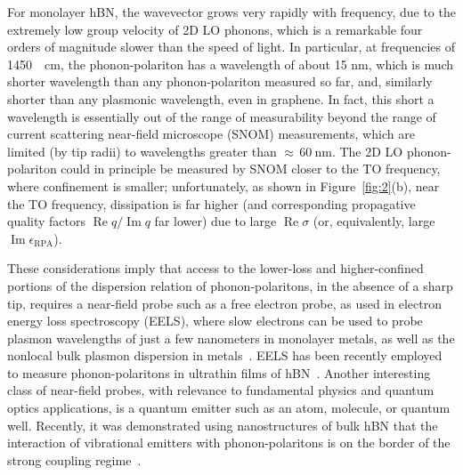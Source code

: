 \documentclass[aps,prb,twocolumn,
	           groupedaddress,superscriptaddress,
               amsfonts,amssymb,amsmath,floatfix,
	           citeautoscript]{revtex4-1}
\renewcommand{\Im}{\operatorname{Im}}
\renewcommand{\Re}{\operatorname{Re}}
\begin{document}
For monolayer hBN, the wavevector grows very rapidly with frequency, due to the extremely low group velocity of 2D LO phonons, which is a remarkable four orders of magnitude slower than the speed of light. In particular, at frequencies of \SI{1450}{\per\cm}, the phonon-polariton has a wavelength of about 15 nm, which is much shorter wavelength than any phonon-polariton measured so far, and, similarly shorter than any plasmonic wavelength, even in graphene. In fact, this short a wavelength is essentially out of the range of measurability beyond the range of current scattering near-field microscope (SNOM) measurements, which are limited (by tip radii) to wavelengths greater than $\approx\,\SI{60}{\nm}$. The 2D LO phonon-polariton could in principle be measured by SNOM closer to the TO frequency, where confinement is smaller; unfortunately, as shown in Figure~\ref{fig:2}(b), near the TO frequency, dissipation is far higher (and corresponding propagative quality factors $\Re q/\Im q$ far lower) due to large $\Re\sigma$ (or, equivalently, large $\Im\epsilon_{\mathrm{RPA}}$).

These considerations imply that access to the lower-loss and higher-confined portions of the dispersion relation of phonon-polaritons, in the absence of a sharp tip, requires a near-field probe such as a free electron probe, as used in electron energy loss spectroscopy (EELS), where slow electrons can be used to probe plasmon wavelengths of just a few nanometers in monolayer metals, as well as the nonlocal bulk plasmon dispersion in metals~\cite{nagao2001dispersion,de2010optical,diaconescu2007low}.
EELS has been recently employed to measure phonon-polaritons in ultrathin films of hBN~\cite{govyadinov2017probing}. Another interesting class of near-field probes, with relevance to fundamental physics and quantum optics applications, is a quantum emitter such as an atom, molecule, or quantum well. Recently, it was demonstrated using nanostructures of bulk hBN that the interaction of vibrational emitters with phonon-polaritons is on the border of the strong coupling regime~\cite{autore2018boron}.
\end{document}
